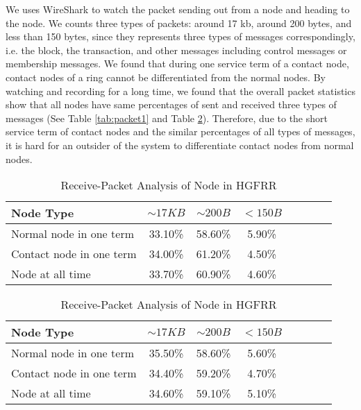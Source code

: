 We uses WireShark \cite{chappell2010wireshark} to watch the packet sending out from a node and heading to the node. We counts three types of packets: around 17 kb, around 200 bytes, and less than 150 bytes, since they represents three types of messages correspondingly, i.e. the block, the transaction, and other messages including control messages or membership messages. We found that during one service term of a contact node, contact nodes of a ring cannot be differentiated from the normal nodes. By watching and recording for a long time, we found that the overall packet statistics show that all nodes have same percentages of sent and received three types of messages (See Table \ref{tab:packet1} and Table \ref{tab:packet2}). Therefore, due to the short service term of contact nodes and the similar percentages of all types of messages, it is hard for an outsider of the system to differentiate contact nodes from normal nodes.

\begin{table}
	\begin{tabular}{l*{6}{c}r}
		Node Type & $\sim17 KB$ & $\sim200 B$ & $<150 B$ \\
		\hline		
		Normal node in one term & 33.10\%	& 58.60\% & 5.90\% \\
		Contact node in one term & 34.00\%	& 61.20\% &4.50\%  \\
		Node at all time  & 33.70\%	& 60.90\% &4.60\%  \\
	\end{tabular}
	\caption{Send-Packet Analysis of Node in HGFRR}
	\label{tab:packet1}
	\vspace{2mm}
	\begin{tabular}{l*{6}{c}r}
		Node Type & $\sim17 KB$ & $\sim200 B$ & $<150 B$ \\
		\hline		
		Normal node in one term & 35.50\% & 58.60\% & 5.60\% \\
		Contact node in one term & 34.40\% & 59.20\% & 4.70\%  \\
		Node at all time  & 34.60\% & 59.10\% & 5.10\%  \\
	\end{tabular}
	\caption{Receive-Packet Analysis of Node in HGFRR}
	\label{tab:packet2}
\end{table}